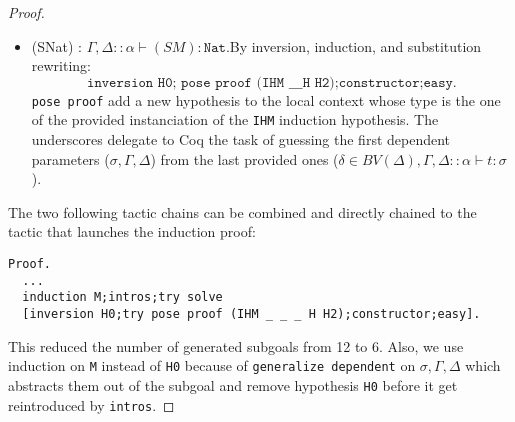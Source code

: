 \documentclass{article}
\begin{document}
\begin{proof}
\begin{itemize}
            \item (SNat) : $\Gamma,\Delta::\alpha\vdash (S M) : \texttt{Nat}$.By inversion, induction, and substitution rewriting: $$\texttt{inversion H0; pose proof (IHM \_ \_ \_ H H2);constructor;easy.}$$ \texttt{pose proof} add a new hypothesis to the local context whose type is the one of the provided instanciation of the \texttt{IHM} induction hypothesis. The underscores delegate to Coq the task of guessing the first dependent parameters ($\sigma,\Gamma,\Delta$) from the last provided ones ($\delta\in BV(\Delta),\Gamma,\Delta::\alpha\vdash t:\sigma$).
        \end{itemize}
        The two following tactic chains can be combined and directly chained to the tactic that launches the induction proof: \begin{verbatim}Proof.
  ...
  induction M;intros;try solve 
  [inversion H0;try pose proof (IHM _ _ _ H H2);constructor;easy].\end{verbatim}This reduced the number of generated subgoals from 12 to 6. Also, we use induction on \texttt{M} instead of \texttt{H0} because of \texttt{generalize dependent} on $\sigma,\Gamma,\Delta$ which abstracts them out of the subgoal and remove hypothesis \texttt{H0} before it get reintroduced by \texttt{intros}.
    \end{proof}
\end{document}
